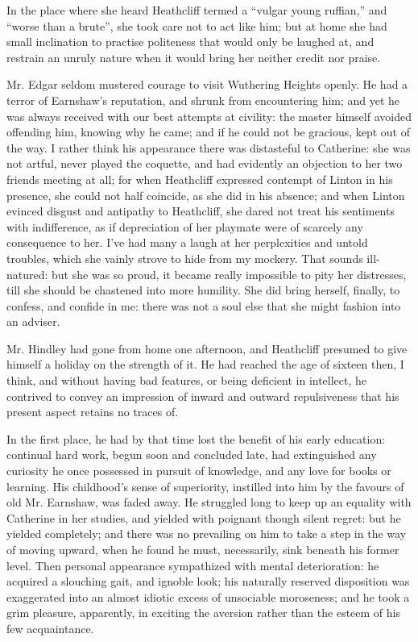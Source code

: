 \par In the place where she heard Heathcliff termed a “vulgar young ruffian,” and “worse than a brute”, she took care not to act like him; but at home she had small inclination to practise politeness that would only be laughed at, and restrain an unruly nature when it would bring her neither credit nor praise.
\par Mr. Edgar seldom mustered courage to visit Wuthering Heights openly. He had a terror of Earnshaw's reputation, and shrunk from encountering him; and yet he was always received with our best attempts at civility: the master himself avoided offending him, knowing why he came; and if he could not be gracious, kept out of the way. I rather think his appearance there was distasteful to Catherine: she was not artful, never played the coquette, and had evidently an objection to her two friends meeting at all; for when Heathcliff expressed contempt of Linton in his presence, she could not half coincide, as she did in his absence; and when Linton evinced disgust and antipathy to Heathcliff, she dared not treat his sentiments with indifference, as if depreciation of her playmate were of scarcely any consequence to her. I've had many a laugh at her perplexities and untold troubles, which she vainly strove to hide from my mockery. That sounds ill-natured: but she was so proud, it became really impossible to pity her distresses, till she should be chastened into more humility. She did bring herself, finally, to confess, and confide in me: there was not a soul else that she might fashion into an adviser.
\par Mr. Hindley had gone from home one afternoon, and Heathcliff presumed to give himself a holiday on the strength of it. He had reached the age of sixteen then, I think, and without having bad features, or being deficient in intellect, he contrived to convey an impression of inward and outward repulsiveness that his present aspect retains no traces of.
\par In the first place, he had by that time lost the benefit of his early education: continual hard work, begun soon and concluded late, had extinguished any curiosity he once possessed in pursuit of knowledge, and any love for books or learning. His childhood's sense of superiority, instilled into him by the favours of old Mr. Earnshaw, was faded away. He struggled long to keep up an equality with Catherine in her studies, and yielded with poignant though silent regret: but he yielded completely; and there was no prevailing on him to take a step in the way of moving upward, when he found he must, necessarily, sink beneath his former level. Then personal appearance sympathized with mental deterioration: he acquired a slouching gait, and ignoble look; his naturally reserved disposition was exaggerated into an almost idiotic excess of unsociable moroseness; and he took a grim pleasure, apparently, in exciting the aversion rather than the esteem of his few acquaintance.

